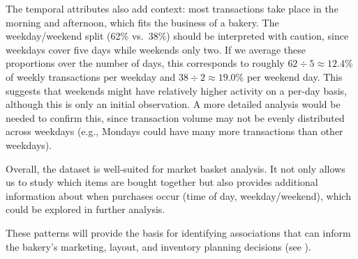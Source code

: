 The temporal attributes also add context: most transactions take place in the morning and afternoon, which fits the business of a bakery.  
The weekday/weekend split (62\% vs.\ 38\%) should be interpreted with caution, since weekdays cover five days while weekends only two.  
If we average these proportions over the number of days, this corresponds to roughly $62 \div 5 \approx 12.4\%$ of weekly transactions per weekday and $38 \div 2 \approx 19.0\%$ per weekend day.  
This suggests that weekends might have relatively higher activity on a per-day basis, although this is only an initial observation.  
A more detailed analysis would be needed to confirm this, since transaction volume may not be evenly distributed across weekdays (e.g., Mondays could have many more transactions than other weekdays).
 

Overall, the dataset is well-suited for market basket analysis.  
It not only allows us to study which items are bought together but also provides additional 
information about when purchases occur 
(time of day, weekday/weekend), which could be explored in further analysis.

These patterns will provide the basis for identifying associations that can inform 
the bakery's marketing, layout, and inventory planning decisions 
(see ).
